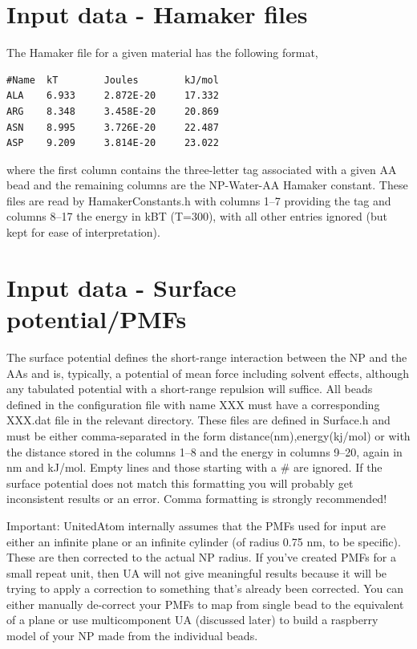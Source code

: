 \documentclass[10pt,a4paper,onecolumn]{report}
\begin{document}
\section{Input data - Hamaker files}
The Hamaker file for a given material has the following format,
\begin{lstlisting}
#Name  kT        Joules        kJ/mol    
ALA    6.933     2.872E-20     17.332    
ARG    8.348     3.458E-20     20.869    
ASN    8.995     3.726E-20     22.487    
ASP    9.209     3.814E-20     23.022    
\end{lstlisting}
where the first column contains the three-letter tag associated with a given AA bead and the remaining columns are the NP-Water-AA Hamaker constant. These files are read by HamakerConstants.h with columns 1--7 providing the tag and columns 8--17 the energy in kBT (T=300), with all other entries ignored (but kept for ease of interpretation).


\section{Input data - Surface potential/PMFs}
The surface potential defines the short-range interaction between the NP and the AAs and is, typically, a potential of mean force including solvent effects, although any tabulated potential with a short-range repulsion will suffice. All beads defined in the configuration file with name XXX must have a corresponding XXX.dat file in the relevant directory. These files are defined in Surface.h and must be either comma-separated in the form distance(nm),energy(kj/mol) or with the distance stored in the columns 1--8 and the energy in columns 9--20, again in nm and kJ/mol. Empty lines and those starting with a \# are ignored. If the surface potential does not match this formatting you will probably get inconsistent results or an error. Comma formatting is strongly recommended! 

Important: UnitedAtom internally assumes that the PMFs used for input are either an infinite plane or an infinite cylinder (of radius 0.75 nm, to be specific). These are then corrected to the actual NP radius. If you've created PMFs for a small repeat unit, then UA will not give meaningful results because it will be trying to apply a correction to something that's already been corrected. You can either manually de-correct your PMFs to map from single bead to the equivalent of a plane or use multicomponent UA (discussed later) to build a raspberry model of your NP made from the individual beads. 
\end{document}
